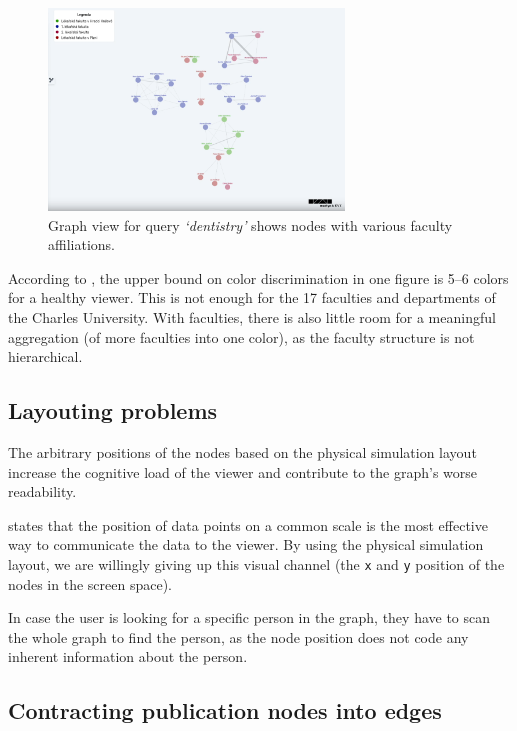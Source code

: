 \begin{figure}[ht!]
    \captionsetup{width=.9\linewidth}
    \includegraphics[width=0.7\textwidth]{../img/color-coding.png}
    \centering
    \caption{Graph view for query \textit{`dentistry'} shows nodes with various faculty affiliations.}
\end{figure}

According to \cite{Cleveland1985}, the upper bound on color discrimination in one figure is 5–6 colors for a healthy viewer. 
This is not enough for the 17 faculties and departments of the Charles University. 
With faculties, there is also little room for a meaningful aggregation (of more faculties into one color), as the faculty structure is not hierarchical.

\subsection{Layouting problems} \label{sec:layouting-problems}

The arbitrary positions of the nodes based on the physical simulation layout increase the cognitive load 
of the viewer and contribute to the graph's worse readability.

\cite{munzner2015visualization} states that the position of data points on a common scale is the most effective way to communicate the data to the viewer.
By using the physical simulation layout, we are willingly giving up this visual channel (the \texttt{x} and \texttt{y} position of the nodes in the screen space).

In case the user is looking for a specific person in the graph, they have to scan the whole graph to find the person, as the node position does not code any inherent information about the person.

\subsection{Contracting publication nodes into edges}

